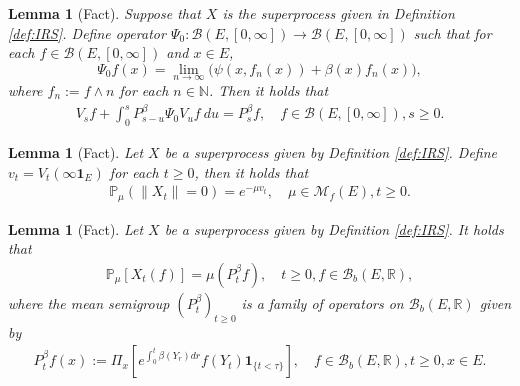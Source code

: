 \documentclass[12pt,a4paper]{amsart}
\numberwithin{equation}{section}
\theoremstyle{plain}
\newtheorem{lem}[thm]{Lemma}
\theoremstyle{definition}
\begin{document}
  \begin{lem}[Fact]
    \label{lem:PSF}
    Suppose that $X$ is the superprocess given in Definition \ref{def:IRS}. 
    Define operator $\Psi_0: \mathcal B(E, [0,\infty]) \to \mathcal B(E,[0,\infty])$ such that for each $f\in \mathcal B(E,[0,\infty])$ and $x\in E$,
\[
  \Psi_0 f(x) = \lim_{n\to \infty}\Big(\psi(x,f_n(x)) + \beta(x)f_n(x)\Big),
\]
where $f_n:= f\wedge n$ for each $n\in \mathbb N$.
Then it holds that
\begin{align}
  \label{eq:PS1}
  V_s f + \int_0^s P_{s-u}^\beta \Psi_0 V_{u} f ~du
  = P_s^\beta f,
  \quad f\in \mathcal B(E,[0,\infty]), s\geq 0.
\end{align}
  \end{lem}
  \begin{lem}[Fact]
    \label{lem:PSE}
    Let $X$ be a superprocess given by Definition \ref{def:IRS}. 
    Define $v_t = V_t(\infty\mathbf 1_E)$ for each $t\geq 0$, then it holds that 
    \begin{align}
      \mathbb P_\mu (\|X_t\| = 0) 
      = e^{- \mu v_t}
      , \quad \mu \in \mathcal M_f(E), t\geq 0.
    \end{align}      
  \end{lem}
  
  \begin{lem}[Fact]
    \label{lem:PSM}
    Let $X$ be a superprocess given by Definition \ref{def:IRS}. 
    It holds that
    \begin{align} 
      \mathbb P_\mu [X_t(f)] = \mu(P^\beta_t f), 
      \quad t \geq 0, f\in \mathcal B_b(E, \mathbb R),
    \end{align} 
    where \emph{the mean semigroup} $(P_t^\beta)_{t\geq 0}$ is a family of operators on $\mathcal B_b(E, \mathbb R)$ given by
    \begin{align}
      P^\beta_tf(x)
      := \Pi_x [e^{\int_0^{t} \beta(Y_r)dr} f(Y_t)\mathbf 1_{\{t<\tau\}}],
      \quad f \in \mathcal B_b(E, \mathbb R),t\geq 0, x\in E.
    \end{align}
  \end{lem}

\begin{comment}
  \begin{lem}[Fact]
    \label{lem:E}
    Let $X$ be the superprocess given in Definition \ref{def:IRS}. 
    Define a function $\psi_0$ on $E\times [0,\infty)$ such that $ \psi_0(x,z)  := \psi(x,z)+ \beta(x) z$ for each  $x\in E$ and  $z \geq 0$.
    Using the monotonicity, extend $\psi$ as a $[0,\infty]$-valued function on $E \times [0,\infty]$ by setting that $\psi(x,\infty) = \lim_{z\uparrow \infty} \psi(x,z)$.
    Define operator $\Psi_0$ on $\mathcal B(E,[0,\infty])$ by $ \Psi_0 g(x):=\psi_0(x, g(x))$.
    Then we have
    \begin{align}
      V_sf+ \int_0^s P_{s-u}^\beta \Psi_0V_u f du = P_s^\beta f,
      \quad s\geq 0, f\in \mathcal B(E, [0,\infty]).
    \end{align}
  \end{lem}
\end{comment}
\end{document}
